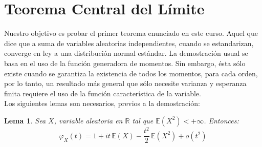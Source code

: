 \documentclass[a4paper]{article}
\newtheorem{lem}{Lema}
\numberwithin{equation}{subsection}
\def\R{\mathbb R}
\def\E{\mathbb E}
\begin{document}
\section{Teorema Central del Límite}
Nuestro objetivo es probar el primer teorema enunciado en este curso. Aquel que dice que a suma de variables aleatorias independientes, cuando se estandarizan, converge en ley a una distribución normal estándar. La demostración usual se basa en el uso de la función generadora de momentos. Sin embargo, ésta sólo existe cuando se garantiza la existencia de todos los momentos, para cada orden, por lo tanto, un resultado más general que sólo necesite varianza y esperanza finita requiere el uso de la función característica de la variable.\\ \newline
Los siguientes lemas son necesarios, previos a la demostración:

\begin{lem} Sea $X$, variable aleatoria en $\R$ tal que $\E(X^2) < +\infty$. Entonces:
\[\varphi_X(t) = 1 + it\,\E(X) - \frac{t^2}{2}\,\E(X^2) + o(t^2)\]
\end{lem}
\end{document}
